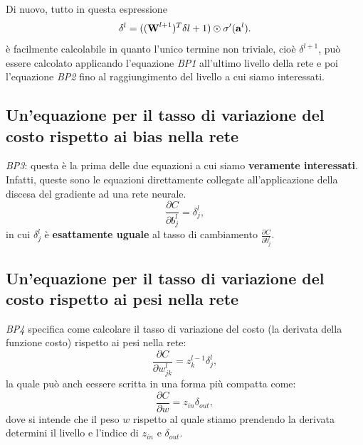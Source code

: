 Di nuovo, tutto in questa espressione
\begin{equation}
    \delta^l=((\text{\textbf{W}}^{l+1})^T\delta{l+1})\odot\sigma'(\text{\textbf{a}}^l).
\end{equation}
è facilmente calcolabile in quanto l'unico termine non triviale, cioè $\delta^{l+1}$, può essere calcolato applicando l'equazione \textit{BP1} all'ultimo livello della rete e poi l'equazione \textit{BP2} fino al raggiungimento del livello a cui siamo interessati.
\newpage
\subsection{Un'equazione per il tasso di variazione del costo rispetto ai bias nella rete}
\textit{BP3}: questa è la prima delle due equazioni a cui siamo \textbf{veramente interessati}. Infatti, queste sono le equazioni direttamente collegate all'applicazione della discesa del gradiente ad una rete neurale.
\begin{equation}
    \frac{\partial C}{\partial b_j^l}=\delta^l_j,
\end{equation}
in cui $\delta^l_j$ è \textbf{esattamente uguale} al tasso di cambiamento $\frac{\partial C}{\partial b_j^l}$.
\subsection{Un'equazione per il tasso di variazione del costo rispetto ai pesi nella rete}
\textit{BP4} specifica come calcolare il tasso di variazione del costo (la derivata della funzione costo) rispetto ai pesi nella rete:
\begin{equation}
    \frac{\partial C}{\partial w_{jk}^l}=z_k^{l-1}\delta_j^l,
\end{equation}
la quale può anch eessere scritta in una forma più compatta come:
\begin{equation}
    \frac{\partial C}{\partial w}=z_{in}\delta_{out},
\end{equation}
dove si intende che il peso $w$ rispetto al quale stiamo prendendo la derivata determini il livello e l'indice di $z_{in}$ e $\delta_{out}$.

